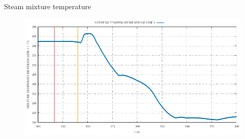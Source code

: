 \begin{frame}{Steam mixture temperature}
	\begin{figure}
		\centering
		\includegraphics[width=\textwidth]{./graphs/MIXTURE TEMPERATURE STEAM LINE 1_comp.pdf}
		
	\end{figure}
	
\end{frame}
%		
%	
%		
%	

